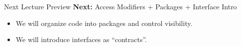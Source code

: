 \documentclass{beamer}
\begin{document}
\begin{frame}{Next Lecture Preview}
  \textbf{Next:} Access Modifiers + Packages + Interface Intro
  \vspace{0.6em}
  \begin{itemize}[<+->]
    \item We will organize code into packages and control visibility.
    \item We will introduce interfaces as ``contracts''.
  \end{itemize}
  \slidesources{\OOPSUnitIISources}
\end{frame}
\end{document}
